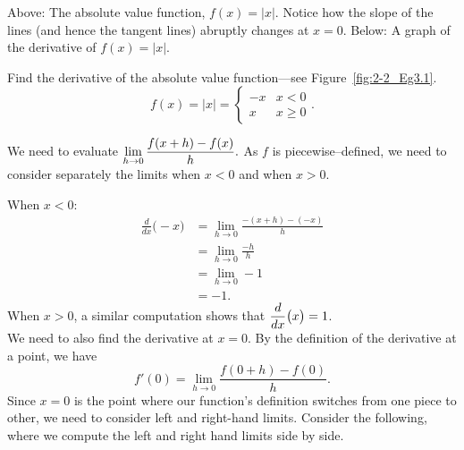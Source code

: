 \begin{marginfigure}[1.5cm] %
\captionsetup[subfigure]{labelformat=empty}

\caption{Above: The absolute value function, $f(x) = |x|$. Notice how the slope of the lines (and hence the tangent lines) abruptly changes at $x=0$. Below: A graph of the derivative of $f(x) = |x|$.}\label{fig:2-2_Eg3.1}
\end{marginfigure}

\begin{example} \label{Ex:2.2.Eg3}
Find the derivative of the absolute value function---see Figure~\ref{fig:2-2_Eg3.1}.
\[ f(x) = |x| = \left\{\begin{array}{cc} -x & x<0 \\ x & x\geq 0\end{array}.\right. \]

\solution We need to evaluate $\displaystyle \lim_{h \to 0}\frac{f(x+h)-f(x)}{h}.$ As $f$ is piecewise--defined, we need to consider separately the limits when $x<0$ and when $x>0$. 

When $x<0$:
\begin{align*}
\frac{d}{dx}\big(-x\big) 	&= \lim_{h\to 0}\frac{-(x+h) - (-x)}{h} \\
&=	\lim_{h \to 0}\frac{-h}{h}\\
&=	\lim_{h \to 0}-1 \\
&=	-1.
\end{align*}
When $x>0$, a similar computation shows that $\displaystyle \frac{d}{dx}\big( x \big) = 1$. \\

We need to also find the derivative at $x=0$. By the definition of the derivative at a point, we have 
\[ f'(0) = \lim_{h \to 0}\frac{f(0+h)-f(0)}{h}.\]
Since $x=0$ is the point where our function's definition switches from one piece to other, we need to consider left and right-hand limits. Consider the following, where we compute the left and right hand limits side by side.


\end{example}
